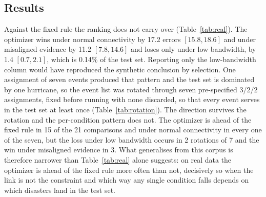 \documentclass[conference,a4paper]{IEEEtran}
\newif\ifsubmission
\newcommand{\mtab}[2]{\ifsubmission#2\else Table~\ref{#1}\fi}
\begin{document}
\subsection{Results}
\label{sec:realresults}
Against the fixed rule the ranking does not carry over (Table~\ref{tab:real}). The optimizer wins under normal connectivity by 17.2 errors $[15.8, 18.6]$ and under misaligned evidence by 11.2 $[7.8, 14.6]$ and loses only under low bandwidth, by 1.4 $[0.7, 2.1]$, which is 0.14\% of the test set. Reporting only the low-bandwidth column would have reproduced the synthetic conclusion by selection. One assignment of seven events produced that pattern and the test set is dominated by one hurricane, so the event list was rotated through seven pre-specified 3/2/2 assignments, fixed before running with none discarded, so that every event serves in the test set at least once (\mtab{tab:rotation}{differences tabulated in the package}). The direction survives the rotation and the per-condition pattern does not. The optimizer is ahead of the fixed rule in 15 of the 21 comparisons and under normal connectivity in every one of the seven, but the loss under low bandwidth occurs in 2 rotations of 7 and the win under misaligned evidence in 3. What generalises from this corpus is therefore narrower than Table~\ref{tab:real} alone suggests: on real data the optimizer is ahead of the fixed rule more often than not, decisively so when the link is not the constraint and which way any single condition falls depends on which disasters land in the test set.
\end{document}
